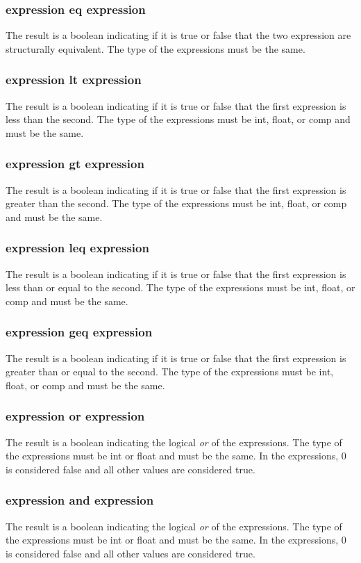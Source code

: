 \subsubsection{expression eq expression}
The result is a boolean indicating if it is true or false that the two expression are structurally equivalent. The type of the expressions must be the same.
\subsubsection{expression lt expression}
The result is a boolean indicating if it is true or false that the first expression is less than the second. The type of the expressions must be int, float, or comp and must be the same.
\subsubsection{expression gt expression}
The result is a boolean indicating if it is true or false that the first expression is greater than the second. The type of the expressions must be int, float, or comp and must be the same.
\subsubsection{expression leq expression}
The result is a boolean indicating if it is true or false that the first expression is less than  or equal to the second. The type of the expressions must be int, float, or comp and must be the same.
\subsubsection{expression geq expression}
The result is a boolean indicating if it is true or false that the first expression is greater than or equal to the second. The type of the expressions must be int, float, or comp and must be the same.
\subsubsection{expression or expression}
The result is a boolean indicating the logical \textit{or} of the expressions. The type of the expressions must be int or float and must be the same. In the expressions, 0 is considered false and all other values are considered true.
\subsubsection{expression and expression}
The result is a boolean indicating the logical \textit{or} of the expressions. The type of the expressions must be int or float and must be the same. In the expressions, 0 is considered false and all other values are considered true.

